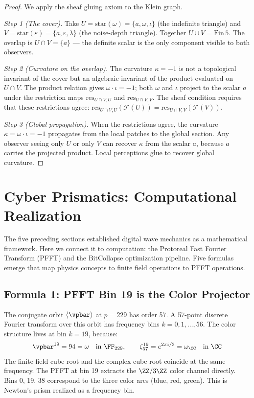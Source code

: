 \begin{proof}
We apply the sheaf gluing axiom to the Klein graph.

\emph{Step 1 (The cover).} Take $U = \mathrm{star}(\omega) = \{a, \omega, \iota\}$ (the indefinite triangle) and $V = \mathrm{star}(\varepsilon) = \{a, \varepsilon, \lambda\}$ (the noise-depth triangle). Together $U \cup V = \mathrm{Fin}\,5$. The overlap is $U \cap V = \{a\}$ --- the definite scalar is the only component visible to both observers.

\emph{Step 2 (Curvature on the overlap).} The curvature $\kappa = -1$ is not a topological invariant of the cover but an algebraic invariant of the product evaluated on $U \cap V$. The product relation gives $\omega \cdot \iota = -1$; both $\omega$ and $\iota$ project to the scalar $a$ under the restriction maps $\mathrm{res}_{U \cap V, U}$ and $\mathrm{res}_{U \cap V, V}$. The sheaf condition requires that these restrictions agree: $\mathrm{res}_{U \cap V, U}(\mathcal{F}(U)) = \mathrm{res}_{U \cap V, V}(\mathcal{F}(V))$.

\emph{Step 3 (Global propagation).} When the restrictions agree, the curvature $\kappa = \omega \cdot \iota = -1$ propagates from the local patches to the global section. Any observer seeing only $U$ or only $V$ can recover $\kappa$ from the scalar $a$, because $a$ carries the projected product. Local perceptions glue to recover global curvature. \qedhere
\end{proof}

\section{Cyber Prismatics: Computational Realization}

The five preceding sections established digital wave mechanics as a mathematical framework. Here we connect it to computation: the Protoreal Fast Fourier Transform (PFFT) and the BitCollapse optimization pipeline. Five formulas emerge that map physics concepts to finite field operations to PFFT operations.

\subsection{Formula 1: PFFT Bin 19 is the Color Projector}

The conjugate orbit $\langle \vpbar \rangle$ at $p = 229$ has order 57. A 57-point discrete Fourier transform over this orbit has frequency bins $k = 0, 1, \ldots, 56$. The color structure lives at bin $k = 19$, because:
\begin{equation}\label{eq:color_projector}
\vpbar^{19} = 94 = \omega \quad \text{in } \FF_{229}, \qquad \zeta_{57}^{19} = e^{2\pi i/3} = \omega_{\CC} \quad \text{in } \CC
\end{equation}
The finite field cube root and the complex cube root coincide at the same frequency. The PFFT at bin 19 extracts the $\ZZ/3\ZZ$ color channel directly. Bins 0, 19, 38 correspond to the three color arcs (blue, red, green). This is Newton's prism realized as a frequency bin.

